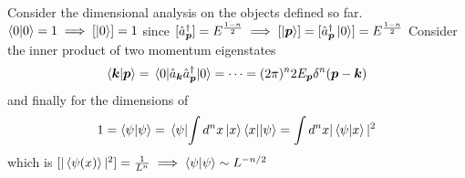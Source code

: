 Consider the dimensional analysis on the objects defined so far. $\expval{0|0} = 1 \implies [\ket{0}] = 1$ since $[\hat{a}_{\bm{p}}^{\dagger}] = E^{\frac{1-n}{2}} \implies [\ket{\bm{p}}] = [\hat{a}_{\bm{p}}^{\dagger} \ket{0} ]  = E^{\frac{1-n}{2}}$ 
Consider the inner product of two momentum eigenstates
$$\expval{\bm{k}|\bm{p}} = \mel{0}{\hat{a}_{\bm{k}} \hat{a}_{\bm{p}}^{\dagger} }{0} = \dots  = (2\pi)^n 2E_{\bm{p}} \delta^n (\bm{p} - \bm{k})$$
and finally for the dimensions of $$1 = \expval{\psi|\psi} = \mel{\psi}{\int d^n x \ket{x} \bra{x}}{\psi} = \int d^n x |\expval{\psi|x}|^2$$
which is $[|\expval{\psi(x)}|^2] = \frac{1}{L^n} \implies \expval{\psi|\psi} \sim L^{-n/2}$


























































































